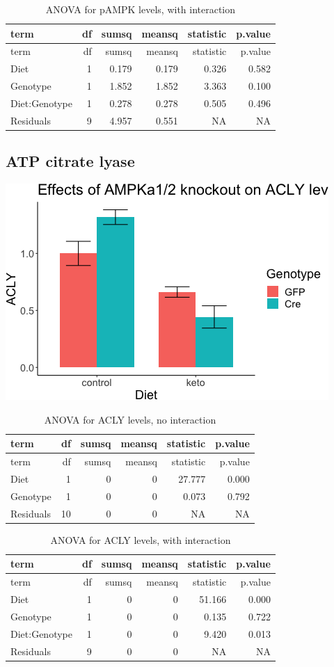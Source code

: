 \documentclass[]{article}
\begin{document}
\begin{longtable}[]{@{}lrrrrr@{}}
\caption{ANOVA for pAMPK levels, with interaction}\tabularnewline
\toprule
term & df & sumsq & meansq & statistic & p.value\tabularnewline
\midrule
\endfirsthead
\toprule
term & df & sumsq & meansq & statistic & p.value\tabularnewline
\midrule
\endhead
Diet & 1 & 0.179 & 0.179 & 0.326 & 0.582\tabularnewline
Genotype & 1 & 1.852 & 1.852 & 3.363 & 0.100\tabularnewline
Diet:Genotype & 1 & 0.278 & 0.278 & 0.505 & 0.496\tabularnewline
Residuals & 9 & 4.957 & 0.551 & NA & NA\tabularnewline
\bottomrule
\end{longtable}

\hypertarget{atp-citrate-lyase}{%
\subsection{ATP citrate lyase}\label{atp-citrate-lyase}}

\includegraphics{figures/ACLY-barplot-1.png}

\begin{longtable}[]{@{}lrrrrr@{}}
\caption{ANOVA for ACLY levels, no interaction}\tabularnewline
\toprule
term & df & sumsq & meansq & statistic & p.value\tabularnewline
\midrule
\endfirsthead
\toprule
term & df & sumsq & meansq & statistic & p.value\tabularnewline
\midrule
\endhead
Diet & 1 & 0 & 0 & 27.777 & 0.000\tabularnewline
Genotype & 1 & 0 & 0 & 0.073 & 0.792\tabularnewline
Residuals & 10 & 0 & 0 & NA & NA\tabularnewline
\bottomrule
\end{longtable}

\begin{longtable}[]{@{}lrrrrr@{}}
\caption{ANOVA for ACLY levels, with interaction}\tabularnewline
\toprule
term & df & sumsq & meansq & statistic & p.value\tabularnewline
\midrule
\endfirsthead
\toprule
term & df & sumsq & meansq & statistic & p.value\tabularnewline
\midrule
\endhead
Diet & 1 & 0 & 0 & 51.166 & 0.000\tabularnewline
Genotype & 1 & 0 & 0 & 0.135 & 0.722\tabularnewline
Diet:Genotype & 1 & 0 & 0 & 9.420 & 0.013\tabularnewline
Residuals & 9 & 0 & 0 & NA & NA\tabularnewline
\bottomrule
\end{longtable}
\end{document}
